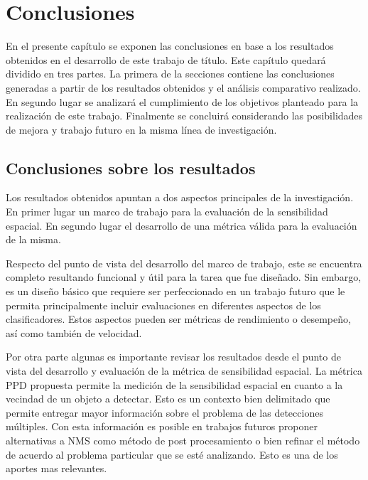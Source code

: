 
\chapter{Conclusiones}
\label{cap:conclusiones}

En el presente capítulo se exponen las conclusiones en base a los resultados obtenidos en el desarrollo de este trabajo de título. Este capítulo quedará dividido en tres partes. La primera de la secciones contiene las conclusiones generadas a partir de los resultados obtenidos y el análisis comparativo realizado. En segundo lugar se analizará el cumplimiento de los objetivos planteado para la realización de este trabajo. Finalmente se concluirá considerando las posibilidades de mejora y trabajo futuro en la misma línea de investigación.


\section{Conclusiones sobre los resultados}

Los resultados obtenidos apuntan a dos aspectos principales de la investigación. En primer lugar un marco de trabajo para la evaluación de la sensibilidad espacial. En segundo lugar el desarrollo de una métrica válida para la evaluación de la misma. 

Respecto del punto de vista del desarrollo del marco de trabajo, este se encuentra completo resultando funcional y útil para la tarea que fue diseñado. Sin embargo, es un diseño básico que requiere ser perfeccionado en un trabajo futuro que le permita principalmente incluir evaluaciones en diferentes aspectos de los clasificadores. Estos aspectos pueden ser métricas de rendimiento o desempeño, así como también de velocidad.  

Por otra parte algunas es importante revisar los resultados desde el punto de vista del desarrollo y evaluación de la métrica de sensibilidad espacial. La métrica PPD propuesta permite la medición de la sensibilidad espacial en cuanto a la vecindad de un objeto a detectar. Esto es un contexto bien delimitado que permite entregar mayor información sobre el problema de las detecciones múltiples. Con esta información es posible en trabajos futuros proponer alternativas a NMS como método de post procesamiento o bien refinar el método de acuerdo al problema particular que se esté analizando. Esto es una de los aportes mas relevantes. 

